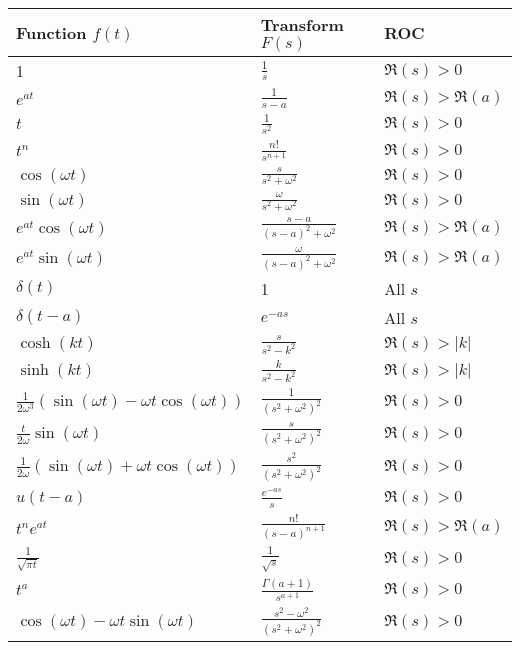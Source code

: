 \documentclass[a4paper,11pt]{article}
\begin{document}
\scriptsize
\begin{table}[h!]
    \centering
    \begin{tabular}{|p{5cm}|p{5cm}|p{2.5cm}|}
    \hline
    \textbf{Function $f(t)$} & \textbf{Transform $F(s)$} & \textbf{ROC} \\
    \hline
    1 & $\frac{1}{s}$ & $\Re(s) > 0$ \\
    \hline
    $e^{at}$ & $\frac{1}{s-a}$ & $\Re(s) > \Re(a)$ \\
    \hline
    $t$ & $\frac{1}{s^2}$ & $\Re(s) > 0$ \\
    \hline
    $t^n$ & $\frac{n!}{s^{n+1}}$ & $\Re(s) > 0$ \\
    \hline
    $\cos(\omega t)$ & $\frac{s}{s^2 + \omega^2}$ & $\Re(s) > 0$ \\
    \hline
    $\sin(\omega t)$ & $\frac{\omega}{s^2 + \omega^2}$ & $\Re(s) > 0$ \\
    \hline
    $e^{at} \cos(\omega t)$ & $\frac{s-a}{(s-a)^2 + \omega^2}$ & $\Re(s) > \Re(a)$ \\
    \hline
    $e^{at} \sin(\omega t)$ & $\frac{\omega}{(s-a)^2 + \omega^2}$ & $\Re(s) > \Re(a)$ \\
    \hline
    $\delta(t)$ & 1 & All $s$ \\
    \hline
    $\delta(t-a)$ & $e^{-as}$ & All $s$ \\
    \hline
    $\cosh(kt)$ & $\frac{s}{s^2 - k^2}$ & $\Re(s) > |k|$ \\
    \hline
    $\sinh(kt)$ & $\frac{k}{s^2 - k^2}$ & $\Re(s) > |k|$ \\
    \hline
    $\frac{1}{2\omega^3} \left(\sin(\omega t) - \omega t \cos(\omega t)\right)$ & $\frac{1}{(s^2 + \omega^2)^2}$ & $\Re(s) > 0$ \\
    \hline
    $\frac{t}{2\omega} \sin(\omega t)$ & $\frac{s}{(s^2 + \omega^2)^2}$ & $\Re(s) > 0$ \\
    \hline
    $\frac{1}{2\omega} \left(\sin(\omega t) + \omega t \cos(\omega t)\right)$ & $\frac{s^2}{(s^2 + \omega^2)^2}$ & $\Re(s) > 0$ \\
    \hline
    $u(t-a)$ & $\frac{e^{-as}}{s}$ & $\Re(s) > 0$ \\
    \hline
    $t^n e^{at}$ & $\frac{n!}{(s-a)^{n+1}}$ & $\Re(s) > \Re(a)$ \\
    \hline
    $\frac{1}{\sqrt{\pi t}}$ & $\frac{1}{\sqrt{s}}$ & $\Re(s) > 0$ \\
    \hline
    $t^a$ & $\frac{\Gamma(a+1)}{s^{a+1}}$ & $\Re(s) > 0$ \\
    \hline
    $\cos(\omega t) - \omega t \sin(\omega t)$ & $\frac{s^2 - \omega^2}{(s^2 + \omega^2)^2}$ & $\Re(s) > 0$ \\
    \hline
    \end{tabular}
\end{table}
\end{document}
